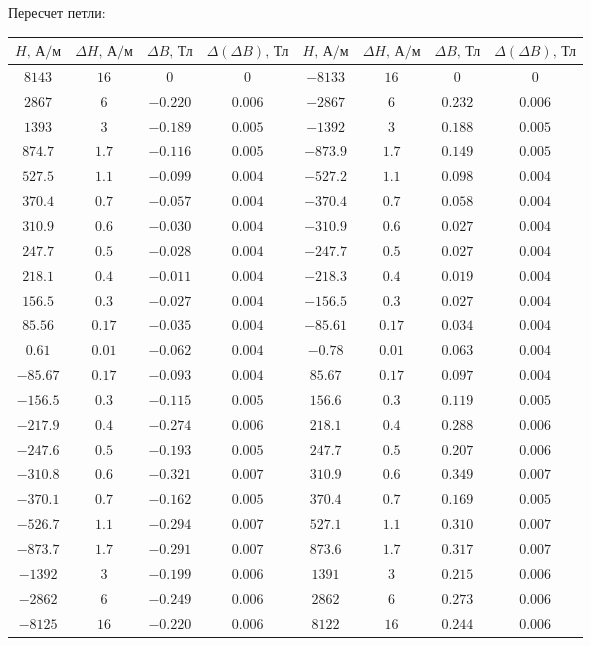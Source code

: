 Пересчет петли:
\begin{center}
\begin{tabular}{|c|c|c|c|c|c|c|c|}\hline
$H\text{, А/м}$&$\Delta H\text{, А/м}$&$\Delta B\text{, Тл}$&$\Delta (\Delta B)\text{, Тл}$&$H\text{, А/м}$&$\Delta H\text{, А/м}$&$\Delta B\text{, Тл}$&$\Delta (\Delta B)\text{, Тл}$\\\hline
$8143$&$16$&$0$&$0$&$-8133$&$16$&$0$&$0$\\\hline
$2867$&$6$&$-0.220$&$0.006$&$-2867$&$6$&$0.232$&$0.006$\\\hline
$1393$&$3$&$-0.189$&$0.005$&$-1392$&$3$&$0.188$&$0.005$\\\hline
$874.7$&$1.7$&$-0.116$&$0.005$&$-873.9$&$1.7$&$0.149$&$0.005$\\\hline
$527.5$&$1.1$&$-0.099$&$0.004$&$-527.2$&$1.1$&$0.098$&$0.004$\\\hline
$370.4$&$0.7$&$-0.057$&$0.004$&$-370.4$&$0.7$&$0.058$&$0.004$\\\hline
$310.9$&$0.6$&$-0.030$&$0.004$&$-310.9$&$0.6$&$0.027$&$0.004$\\\hline
$247.7$&$0.5$&$-0.028$&$0.004$&$-247.7$&$0.5$&$0.027$&$0.004$\\\hline
$218.1$&$0.4$&$-0.011$&$0.004$&$-218.3$&$0.4$&$0.019$&$0.004$\\\hline
$156.5$&$0.3$&$-0.027$&$0.004$&$-156.5$&$0.3$&$0.027$&$0.004$\\\hline
$85.56$&$0.17$&$-0.035$&$0.004$&$-85.61$&$0.17$&$0.034$&$0.004$\\\hline
$0.61$&$0.01$&$-0.062$&$0.004$&$-0.78$&$0.01$&$0.063$&$0.004$\\\hline
$-85.67$&$0.17$&$-0.093$&$0.004$&$85.67$&$0.17$&$0.097$&$0.004$\\\hline
$-156.5$&$0.3$&$-0.115$&$0.005$&$156.6$&$0.3$&$0.119$&$0.005$\\\hline
$-217.9$&$0.4$&$-0.274$&$0.006$&$218.1$&$0.4$&$0.288$&$0.006$\\\hline
$-247.6$&$0.5$&$-0.193$&$0.005$&$247.7$&$0.5$&$0.207$&$0.006$\\\hline
$-310.8$&$0.6$&$-0.321$&$0.007$&$310.9$&$0.6$&$0.349$&$0.007$\\\hline
$-370.1$&$0.7$&$-0.162$&$0.005$&$370.4$&$0.7$&$0.169$&$0.005$\\\hline
$-526.7$&$1.1$&$-0.294$&$0.007$&$527.1$&$1.1$&$0.310$&$0.007$\\\hline
$-873.7$&$1.7$&$-0.291$&$0.007$&$873.6$&$1.7$&$0.317$&$0.007$\\\hline
$-1392$&$3$&$-0.199$&$0.006$&$1391$&$3$&$0.215$&$0.006$\\\hline
$-2862$&$6$&$-0.249$&$0.006$&$2862$&$6$&$0.273$&$0.006$\\\hline
$-8125$&$16$&$-0.220$&$0.006$&$8122$&$16$&$0.244$&$0.006$\\\hline
\end{tabular}\\~\\
\end{center}

